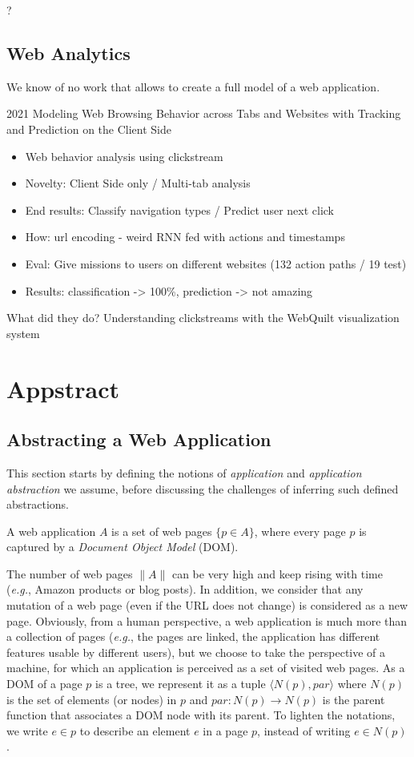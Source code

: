 ?


\subsection{Web Analytics}
We know of no work that allows to create a full model of a web application.

2021 Modeling Web Browsing Behavior across Tabs and Websites with Tracking and Prediction on the Client Side~\cite{Ou2021ModelingSide}

\begin{itemize}
\item Web behavior analysis using clickstream
\item Novelty: Client Side only / Multi-tab analysis
\item End results: Classify navigation types / Predict user next click
\item How: url encoding - weird RNN fed with actions and timestamps
\item Eval: Give missions to users on different websites (132 action paths / 19 test)
\item Results: classification -> 100\%, prediction -> not amazing
\end{itemize}

What did they do? Understanding clickstreams with the WebQuilt visualization system~\cite{Ou2021ModelingSide}



\section{Appstract}\label{sec:appstract}
\subsection{Abstracting a Web Application}
This section starts by defining the notions of \emph{application} and \emph{application abstraction} we assume, before discussing the challenges of inferring such defined abstractions.

\begin{defn}[\em Application]
A web application $A$ is a set of web pages $\{p \in A\}$, where every page $p$ is captured by a \emph{Document Object Model} (DOM).
\end{defn}

The number of web pages $\|A\|$ can be very high and keep rising with time (\emph{e.g.}, Amazon products or blog posts).
In addition, we consider that any mutation of a web page (even if the URL does not change) is considered as a new page.
Obviously, from a human perspective, a web application is much more than a collection of pages (\emph{e.g.}, the pages are linked, the application has different features usable by different users), but we choose to take the perspective of a machine, for which an application is perceived as a set of visited web pages.
% 
As a DOM of a page $p$ is a tree, we represent it as a tuple $\langle N(p), par \rangle$ where $N(p)$ is the set of elements (or nodes) in $p$ and $par: N(p) \to N(p)$ is the parent function that associates a DOM node with its parent.
To lighten the notations, we write $e \in p$ to describe an element $e$ in a page $p$, instead of writing $e \in N(p)$.

